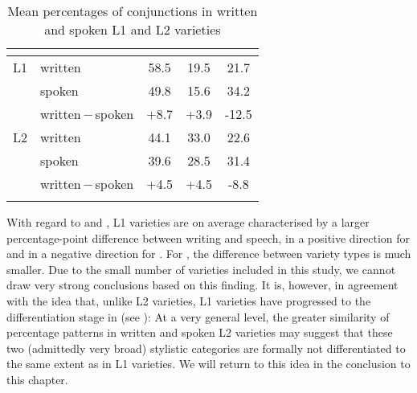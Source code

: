 \begin{table}
\caption{\label{bkm:Ref60066185}\label{tab:10.1}Mean percentages of conjunctions in written and spoken L1 and L2 varieties}
\begin{tabular}{ll *3{S[table-format=-2.1]}}
\lsptoprule
&  & {\itshape {}} & {\itshape {}} & {\itshape {}}\\\midrule
{}L1 & written & 58.5 & 19.5 & 21.7\\
& spoken & 49.8 & 15.6 & 34.2\\
& written\,$-$\,spoken & +8.7 & +3.9 & -12.5\\\midrule
{}L2 & written & 44.1 & 33.0 & 22.6\\
& spoken & 39.6 & 28.5 & 31.4\\
& written\,$-$\,spoken & +4.5 & +4.5 & -8.8\\
\lspbottomrule
\end{tabular}
\end{table}

With regard to  and , L1 varieties are on average characterised by a larger percentage-point difference between writing and speech, in a positive direction for  and in a negative direction for . For , the difference between variety types is much smaller. Due to the small number of varieties included in this study, we cannot draw very strong conclusions based on this finding. It is, however, in agreement with the idea that, unlike L2 varieties, L1 varieties have progressed to the differentiation stage in   (see ): At a very general level, the greater similarity of percentage patterns in written and spoken L2 varieties may suggest that these two (admittedly very broad) stylistic categories are formally not differentiated to the same extent as in L1 varieties. We will return to this idea in the conclusion to this chapter.

